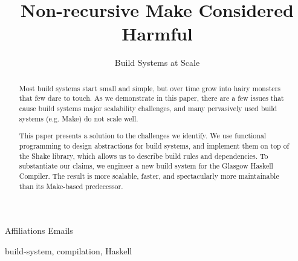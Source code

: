 \documentclass[preprint]{sigplanconf}
\begin{document}
\setlength{\pdfpageheight}{\paperheight}
\setlength{\pdfpagewidth}{\paperwidth}


\title{Non-recursive Make Considered Harmful}
\subtitle{Build Systems at Scale}

           {Affiliations}
           {Emails}

\maketitle

\begin{abstract}
Most build systems start small and simple, but over time grow into hairy monsters
that few dare to touch. As we demonstrate in this paper, there are a few issues
that cause build systems major scalability challenges, and many pervasively
used build systems (e.g. Make) do not scale well.

This paper presents a solution to the challenges we identify. We use functional
programming to design abstractions for build systems, and implement
them on top of the Shake library, which allows us to describe build rules and
dependencies. To substantiate our claims, we engineer a new build system
for the Glasgow Haskell Compiler. The result is more scalable, faster, and
spectacularly more maintainable than its Make-based predecessor.
\end{abstract}

\keywords
build-system, compilation, Haskell













\balance

\end{document}
